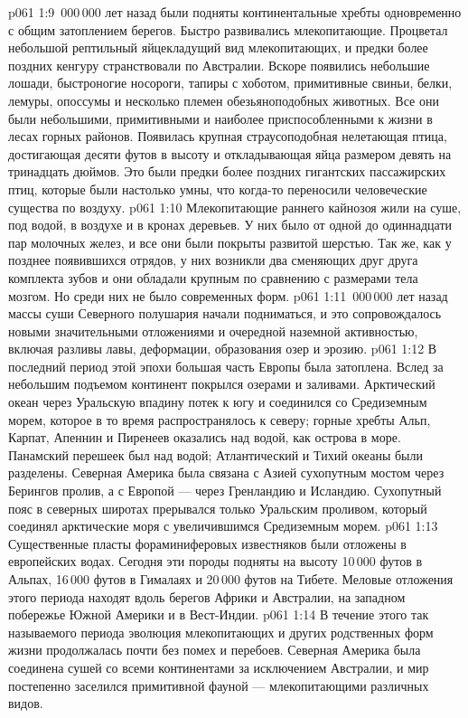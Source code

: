\vs p061 1:9 \,000\,000 лет назад были подняты континентальные хребты одновременно с общим затоплением берегов. Быстро развивались млекопитающие. Процветал небольшой рептильный яйцекладущий вид млекопитающих, и предки более поздних кенгуру странствовали по Австралии. Вскоре появились небольшие лошади, быстроногие носороги, тапиры с хоботом, примитивные свиньи, белки, лемуры, опоссумы и несколько племен обезьяноподобных животных. Все они были небольшими, примитивными и наиболее приспособленными к жизни в лесах горных районов. Появилась крупная страусоподобная нелетающая птица, достигающая десяти футов в высоту и откладывающая яйца размером девять на тринадцать дюймов. Это были предки более поздних гигантских пассажирских птиц, которые были настолько умны, что когда\hyp{}то переносили человеческие существа по воздуху.
\vs p061 1:10 Млекопитающие раннего кайнозоя жили на суше, под водой, в воздухе и в кронах деревьев. У них было от одной до одиннадцати пар молочных желез, и все они были покрыты развитой шерстью. Так же, как у позднее появившихся отрядов, у них возникли два сменяющих друг друга комплекта зубов и они обладали крупным по сравнению с размерами тела мозгом. Но среди них не было современных форм.
\vs p061 1:11 \,000\,000 лет назад массы суши Северного полушария начали подниматься, и это сопровождалось новыми значительными отложениями и очередной наземной активностью, включая разливы лавы, деформации, образования озер и эрозию.
\vs p061 1:12 В последний период этой эпохи большая часть Европы была затоплена. Вслед за небольшим подъемом континент покрылся озерами и заливами. Арктический океан через Уральскую впадину потек к югу и соединился со Средиземным морем, которое в то время распространялось к северу; горные хребты Альп, Карпат, Апеннин и Пиренеев оказались над водой, как острова в море. Панамский перешеек был над водой; Атлантический и Тихий океаны были разделены. Северная Америка была связана с Азией сухопутным мостом через Берингов пролив, а с Европой --- через Гренландию и Исландию. Сухопутный пояс в северных широтах прерывался только Уральским проливом, который соединял арктические моря с увеличившимся Средиземным морем.
\vs p061 1:13 Существенные пласты фораминиферовых известняков были отложены в европейских водах. Сегодня эти породы подняты на высоту 10\,000 футов в Альпах, 16\,000 футов в Гималаях и 20\,000 футов на Тибете. Меловые отложения этого периода находят вдоль берегов Африки и Австралии, на западном побережье Южной Америки и в Вест\hyp{}Индии.
\vs p061 1:14 \pc В течение этого так называемого  периода эволюция млекопитающих и других родственных форм жизни продолжалась почти без помех и перебоев. Северная Америка была соединена сушей со всеми континентами за исключением Австралии, и мир постепенно заселился примитивной фауной --- млекопитающими различных видов.
